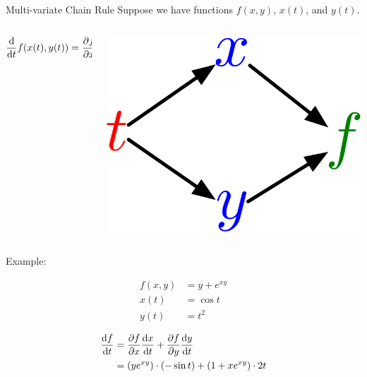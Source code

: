 \documentclass[handout,aspectratio=169]{beamer}
\begin{document}
\begin{frame}{Multi-variate Chain Rule}
Suppose we have functions $f(x, y)$, $x(t)$, and $y(t)$. 
      \begin{columns}
        \begin{column}{0.7 \linewidth}
          \[ \frac{\mathrm{d}}{\mathrm{d} t} f(x(t), y(t)) = \frac{\partial f}{\partial x} \frac{\mathrm{d} x}{\mathrm{d} t} + \frac{\partial f}{\partial y} \frac{\mathrm{d} y}{\mathrm{d} t} \]
        \end{column}
        \begin{column}{0.2 \linewidth}
          \includegraphics[width=\linewidth]{pics/toy_multivariate_graph.png}
        \end{column}
      \end{columns}

\vfill

Example:

\begin{minipage}{0.45\textwidth}
\centering
      \begin{align*}
        f(x, y) &= y + e^{xy} \\
        x(t) &= \cos t \\
        y(t) &= t^2
      \end{align*}
\end{minipage}\begin{minipage}{0.45\textwidth}
\centering
      \begin{align*}
        \frac{\mathrm{d} f}{\mathrm{d} t} &= \frac{\partial f}{\partial x} \frac{\mathrm{d} x}{\mathrm{d} t} + \frac{\partial f}{\partial y} \frac{\mathrm{d} y}{\mathrm{d} t} \\
        &= \left( y e^{xy} \right) \cdot \left( -\sin t \right) + \left( 1 + xe^{xy} \right) \cdot 2t
      \end{align*}
\end{minipage}
\end{frame}
\end{document}
